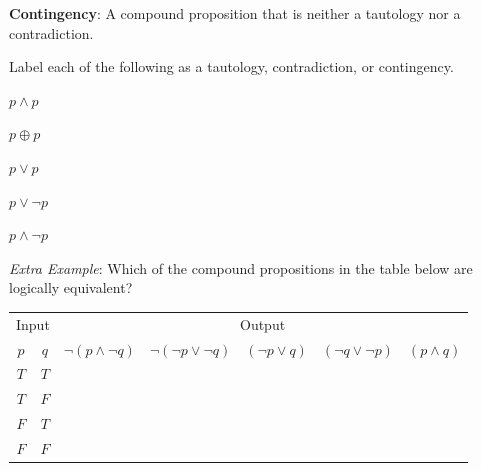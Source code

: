 \documentclass[12pt, oneside]{article}
\begin{document}
{\bf Contingency}: A compound proposition that is neither a tautology nor a contradiction.
 \vfill


Label each of the following as a tautology, contradiction, or contingency.

$p \land p$

$p \oplus p$

$p \lor p$

$p \lor \lnot p$

$p \land \lnot p$ \vfill


{\it Extra Example}: Which of the  compound propositions in the table below are logically equivalent?
\begin{center}
\begin{tabular}{cc||c|c|c|c|c}
\multicolumn{2}{c||}{Input}  & \multicolumn{5}{c}{Output} \\
$p$ & $q$ & $\lnot (p \land \lnot q)$ & $\lnot (\lnot p  \lor \lnot q)$ &  $(\lnot p \lor  q)$
& $(\lnot q \lor \lnot p)$ & $(p \land q)$  \\
\hline
$T$ & $T$ & &&&&\\
$T$ & $F$ & &&&&\\
$F$ & $T$ & &&&&\\
$F$ & $F$ & &&&&\\
\end{tabular}
\end{center} \vfill
\newpage
\end{document}
